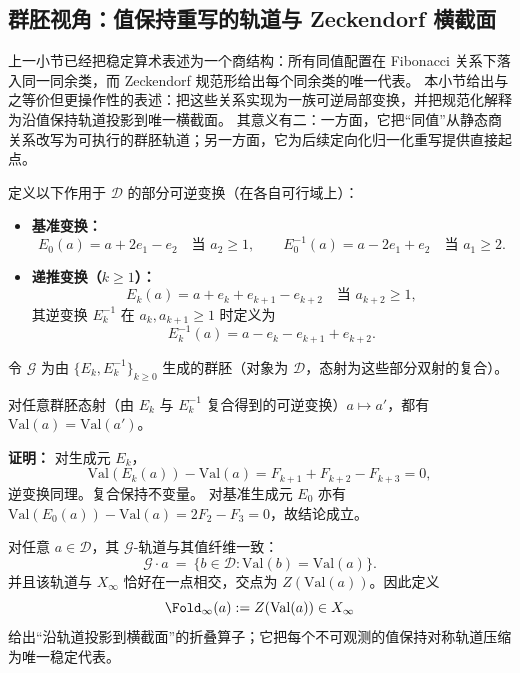 \subsection{群胚视角：值保持重写的轨道与 Zeckendorf 横截面}\label{sec:groupoid-zeckendorf}

上一小节已经把稳定算术表述为一个商结构：所有同值配置在 Fibonacci 关系下落入同一同余类，而 Zeckendorf 规范形给出每个同余类的唯一代表。
本小节给出与之等价但更操作性的表述：把这些关系实现为一族可逆局部变换，并把规范化解释为沿值保持轨道投影到唯一横截面。
其意义有二：一方面，它把“同值”从静态商关系改写为可执行的群胚轨道；另一方面，它为后续定向化归一化重写提供直接起点。

\begin{definition}\label{def:fib-moves}
定义以下作用于 $\mathcal{D}$ 的部分可逆变换（在各自可行域上）：
\begin{itemize}
  \item \textbf{基准变换：}
  \[
  E_0(a)=a+2e_1-e_2\quad\text{当 }a_{2}\ge 1,
  \qquad
  E_0^{-1}(a)=a-2e_1+e_2\quad\text{当 }a_{1}\ge 2.
  \]
  \item \textbf{递推变换（$k\ge 1$）：}
  \[
  E_k(a)=a+e_k+e_{k+1}-e_{k+2}\quad\text{当 }a_{k+2}\ge 1,
  \]
  其逆变换 $E_k^{-1}$ 在 $a_k,a_{k+1}\ge 1$ 时定义为
  \[
  E_k^{-1}(a)=a-e_k-e_{k+1}+e_{k+2}.
  \]
\end{itemize}
令 $\mathcal{G}$ 为由 $\{E_k,E_k^{-1}\}_{k\ge 0}$ 生成的群胚（对象为 $\mathcal{D}$，态射为这些部分双射的复合）。
\end{definition}

\begin{proposition}[轨道不变量]\label{prop:orbits-preserve-val}
对任意群胚态射（由 $E_k$ 与 $E_k^{-1}$ 复合得到的可逆变换）$a\mapsto a'$，都有 $\mathrm{Val}(a)=\mathrm{Val}(a')$。
\end{proposition}

\textbf{证明：}
对生成元 $E_k$，
\[
\mathrm{Val}(E_k(a))-\mathrm{Val}(a)
=F_{k+1}+F_{k+2}-F_{k+3}=0,
\]
逆变换同理。复合保持不变量。
对基准生成元 $E_0$ 亦有 $\mathrm{Val}(E_0(a))-\mathrm{Val}(a)=2F_2-F_3=0$，故结论成立。

\begin{theorem}[轨道横截面与折叠的群论解释]\label{thm:zeckendorf-transversal}
对任意 $a\in\mathcal{D}$，其 $\mathcal{G}$-轨道与其值纤维一致：
\[
\mathcal{G}\cdot a \ =\ \{b\in\mathcal{D}:\mathrm{Val}(b)=\mathrm{Val}(a)\}.
\]
并且该轨道与 $X_\infty$ 恰好在一点相交，交点为 $Z(\mathrm{Val}(a))$。因此定义
\[
\Fold_\infty(a):=Z(\mathrm{Val}(a))\in X_\infty
\]
给出“沿轨道投影到横截面”的折叠算子；它把每个不可观测的值保持对称轨道压缩为唯一稳定代表。
\end{theorem}

